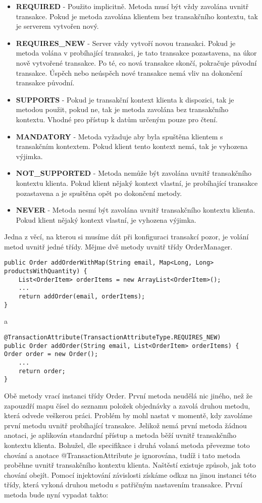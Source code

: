 \documentclass[122pt,oneside]{fithesis}
\begin{document}
\begin{itemize}
  \item {\bf REQUIRED} - Použito implicitně. Metoda musí být vždy zavolána uvnitř transakce. Pokud je metoda zavolána klientem bez transakčního kontextu, tak je serverem vytvořen nový.
  \item {\bf REQUIRES\_NEW} - Server vždy vytvoří novou transakci. Pokud je metoda volána v probíhající transakci, je tato transakce pozastavena, na úkor nově vytvořené transakce. Po té, co nová transakce skončí, pokračuje původní transakce. Úspěch nebo neúspěch nové transakce nemá vliv na dokončení transakce původní.
  \item {\bf SUPPORTS} - Pokud je transakční kontext klienta k dispozici, tak je metodou použit, pokud ne, tak je metoda zavolána bez transakčního kontextu. Vhodné pro přístup k datům určeným pouze pro čtení.
  \item {\bf MANDATORY} - Metoda vyžaduje aby byla spuštěna klientem s transakčním kontextem. Pokud klient tento kontext nemá, tak je vyhozena výjimka.
  \item {\bf NOT\_SUPPORTED} - Metoda nemůže být zavolána uvnitř transakčního kontextu klienta. Pokud klient nějaký kontext vlastní, je probíhající transakce pozastavena a je spuštěna opět po dokončení metody.
  \item {\bf NEVER} - Metoda nesmí být zavolána uvnitř transakčního kontextu klienta. Pokud klient nějaký kontext vlastní, je vyhozena výjimka.
\end{itemize}
Jedna z věcí, na kterou si musíme dát při konfiguraci transakcí pozor, je volání metod uvnitř jedné třídy. Mějme dvě metody uvnitř třídy OrderManager.

\begin{lstlisting}
public Order addOrderWithMap(String email, Map<Long, Long> productsWithQuantity) {
	List<OrderItem> orderItems = new ArrayList<OrderItem>();
	...
	return addOrder(email, orderItems);
}
\end{lstlisting}

a

\begin{lstlisting}
@TransactionAttribute(TransactionAttributeType.REQUIRES_NEW)
public Order addOrder(String email, List<OrderItem> orderItems) {
Order order = new Order();
	...
	return order;
}
\end{lstlisting}

Obě metody vrací instanci třídy Order. První metoda neudělá nic jiného, než že zapouzdří mapu čísel do seznamu položek objednávky a zavolá druhou metodu, která odvede veškerou práci. Problém by mohl nastat v momentě, kdy zavoláme první metodu uvnitř probíhající transakce. Jelikož nemá první metoda žádnou anotaci, je aplikován standardní přístup a metoda běží uvnitř transakčního kontextu klienta. Bohužel, dle specifikace i druhá volaná metoda převezme toto chování a anotace @TransactionAttribute je ignorována, tudíž i tato metoda proběhne uvnitř transakčního kontextu klienta. Naštěstí existuje způsob, jak toto chování obejít. Pomocí injektování závislosti získáme odkaz na jinou instanci této třídy, která vykoná druhou metodu s patřičným nastavením transakce. První metoda bude nyní vypadat takto:
\end{document}
